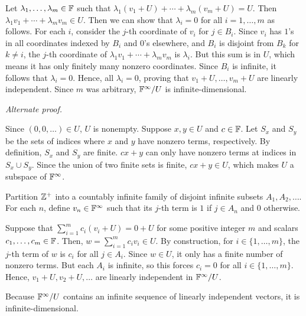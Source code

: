 \begin{exc}
\begin{solution}
\begin{parts}
  Let $\lambda_1,\dots,\lambda_m\in\mathbb{F}$ such that
  $\lambda_1(v_1+U)+\cdots+\lambda_m(v_m+U)=U$. Then
  $\lambda_1v_1+\cdots+\lambda_mv_m\in U$. Then we can show that $\lambda_i=0$
  for all $i=1,\dots,m$ as follows. For each $i$, consider the $j$-th coordinate
  of $v_i$ for $j\in B_i$. Since $v_i$ has $1$'s in all coordinates indexed by
  $B_i$ and $0$'s elsewhere, and $B_i$ is disjoint from $B_k$ for $k\ne i$, the
  $j$-th coordinate of $\lambda_1v_1+\cdots+\lambda_mv_m$ is $\lambda_i$. But
  this sum is in $U$, which means it has only finitely many nonzero coordinates.
  Since $B_i$ is infinite, it follows that $\lambda_i=0$. Hence, all
  $\lambda_i=0$, proving that $v_1+U,\dots,v_m+U$ are linearly independent.
  Since $m$ was arbitrary, $\mathbb{F}^\infty/U$ is infinite-dimensional.
\end{parts}

\emph{Alternate proof.}
\begin{parts}
\item Since $(0,0,\dots)\in U$, $U$ is nonempty. Suppose $x,y\in U$ and
  $c\in\mathbb{F}$. Let $S_x$ and $S_y$ be the sets of indices where $x$ and $y$ have
  nonzero terms, respectively. By definition, $S_x$ and $S_y$ are finite.
  $cx+y$ can only have nonzero terms at indices in $S_x\cup S_y$. Since the
  union of two finite sets is finite, $cx+y\in U$, which makes $U$ a subspace
  of $\mathbb{F}^\infty$.
\item Partition $\mathbb{Z}^+$ into a countably infinite family of disjoint infinite
  subsets $A_1,\allowbreak A_2,\allowbreak\dots$. For each $n$, define $v_n\in\mathbb{F}^\infty$ such that its
  $j$-th term is $1$ if $j\in A_n$ and $0$ otherwise.

  Suppose that $\sum_{i=1}^m c_i(v_i+U)=0+U$ for some positive integer $m$ and
  scalars $c_1,\dots,c_m\in\mathbb{F}$. Then, $w=\sum_{i=1}^m c_iv_i\in U$. By
  construction, for $i\in\{1,\dots,m\}$, the $j$-th term of $w$ is $c_i$ for all
  $j\in A_i$. Since $w\in U$, it only has a finite number of nonzero terms. But
  each $A_i$ is infinite, so this forces $c_i=0$ for all $i\in\{1,\dots,m\}$.
  Hence, $v_1+U,v_2+U,\dots$ are linearly independent in $\mathbb{F}^\infty/U$.

  Because $\mathbb{F}^\infty/U$ contains an infinite sequence of linearly independent
  vectors, it is infinite-dimensional.
\end{parts}
\end{solution}


\end{exc}
